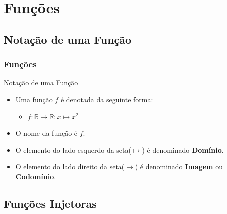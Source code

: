 \documentclass{beamer}
\begin{document}
\section{Funções}
\subsection{Notação de uma Função}
\begin{frame}
\frametitle{Funções}

	\begin{block}{Notação de uma Função}
		\begin{itemize}
			\item<1-> Uma função $f$ é denotada da seguinte forma:
				\begin{itemize}
					\item $f:\mathbb{R} \to \mathbb{R} : x \mapsto x^2$
				\end{itemize}
			\item<2-> O nome da função é $f$.
			\item<3-> O elemento do lado esquerdo da seta($\mapsto$) é denominado \textbf{Domínio}.
			\item<4-> O elemento do lado direito da seta($\mapsto$) é denominado \textbf{Imagem} ou \textbf{Codomínio}.
		\end{itemize}
	\end{block}
	
\end{frame}

\subsection{Funções Injetoras}
\end{document}
